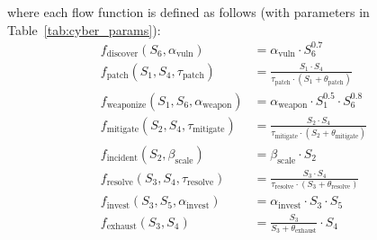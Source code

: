 \documentclass[11pt]{article}
\begin{document}
\noindent where each flow function is defined as follows (with parameters in Table~\ref{tab:cyber_params}):
\begin{align}
f_{\text{discover}}(S_6, \alpha_{\text{vuln}}) &= \alpha_{\text{vuln}} \cdot S_6^{0.7} \\
f_{\text{patch}}(S_1, S_4, \tau_{\text{patch}}) &= \frac{S_1 \cdot S_4}{\tau_{\text{patch}} \cdot (S_1 + \theta_{\text{patch}})} \\
f_{\text{weaponize}}(S_1, S_6, \alpha_{\text{weapon}}) &= \alpha_{\text{weapon}} \cdot S_1^{0.5} \cdot S_6^{0.8} \\
f_{\text{mitigate}}(S_2, S_4, \tau_{\text{mitigate}}) &= \frac{S_2 \cdot S_4}{\tau_{\text{mitigate}} \cdot (S_2 + \theta_{\text{mitigate}})} \\
f_{\text{incident}}(S_2, \beta_{\text{scale}}) &= \beta_{\text{scale}} \cdot S_2 \\
f_{\text{resolve}}(S_3, S_4, \tau_{\text{resolve}}) &= \frac{S_3 \cdot S_4}{\tau_{\text{resolve}} \cdot (S_3 + \theta_{\text{resolve}})} \\
f_{\text{invest}}(S_3, S_5, \alpha_{\text{invest}}) &= \alpha_{\text{invest}} \cdot S_3 \cdot S_5 \\
f_{\text{exhaust}}(S_3, S_4) &= \frac{S_3}{S_3 + \theta_{\text{exhaust}}} \cdot S_4
\end{align}
\end{document}
